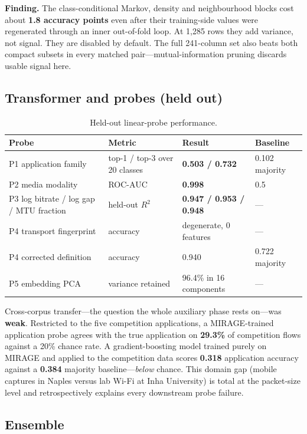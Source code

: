 \documentclass[11pt]{article}
\begin{document}
\textbf{Finding.} The class-conditional Markov, density and neighbourhood blocks cost about \textbf{1.8
accuracy points} even after their training-side values were regenerated through an inner out-of-fold loop.
At 1{,}285 rows they add variance, not signal. They are disabled by default. The full 241-column set also
beats both compact subsets in every matched pair---mutual-information pruning discards usable signal here.

\subsection{Transformer and probes (held out)}

\begin{table}[htbp]
\centering\small
\caption{Held-out linear-probe performance.}
\label{tab:probes}
\begin{tabular}{llll}
\toprule
Probe & Metric & Result & Baseline \\
\midrule
P1 application family & top-1 / top-3 over 20 classes & \textbf{0.503 / 0.732} & 0.102 majority \\
P2 media modality & ROC-AUC & \textbf{0.998} & 0.5 \\
P3 log bitrate / log gap / MTU fraction & held-out $R^2$ & \textbf{0.947 / 0.953 / 0.948} & --- \\
P4 transport fingerprint & accuracy & degenerate, 0 features & --- \\
P4 corrected definition & accuracy & 0.940 & 0.722 majority \\
P5 embedding PCA & variance retained & 96.4\% in 16 components & --- \\
\bottomrule
\end{tabular}
\end{table}

Cross-corpus transfer---the question the whole auxiliary phase rests on---was \textbf{weak}. Restricted to
the five competition applications, a MIRAGE-trained application probe agrees with the true application on
\textbf{29.3\%} of competition flows against a 20\% chance rate. A gradient-boosting model trained purely on
MIRAGE and applied to the competition data scores \textbf{0.318} application accuracy against a
\textbf{0.384} majority baseline---\emph{below} chance. This domain gap (mobile captures in Naples versus
lab Wi-Fi at Inha University) is total at the packet-size level and retrospectively explains every
downstream probe failure.

\subsection{Ensemble}
\end{document}
